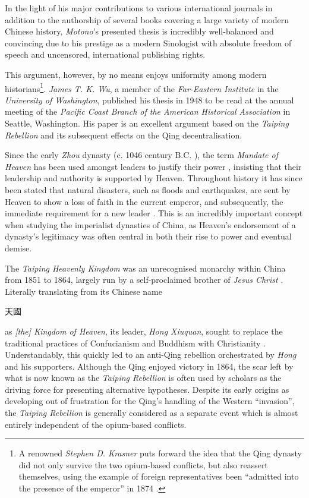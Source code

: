 \documentclass[a4paper,oneside]{article}
\newcommand{\zht}[1]{%
        \begin{CJK*}{UTF8}{bsmi}%
                \normalfont%
                #1
        \end{CJK*}
}
\begin{document}
In the light of his major contributions to various international journals in
addition to the authorship of several books covering a large variety of modern
Chinese history, \textit{Motono}'s presented thesis is incredibly well-balanced
and convincing due to his prestige as a modern Sinologist with absolute freedom
of speech and uncensored, international publishing rights.

This argument, however, by no means enjoys uniformity among modern
historians\footnote{A renowned \textit{Stephen D. Krasner} puts forward the idea
that the Qing dynasty did not only survive the two opium-based conflicts, but
also reassert themselves, using the example of foreign representatives been
``admitted into the presence of the emperor'' in 1874 \autocite{Krasner:2001}.}.
\textit{James T. K. Wu}, a member of the \textit{Far-Eastern Institute} in the
\textit{University of Washington}, published his thesis in 1948 to be read at
the annual meeting of the \textit{Pacific Coast Branch of the American
Historical Association} in Seattle, Washington. His paper is an excellent
argument based on the \textit{Taiping Rebellion} and its subsequent effects on
the Qing decentralisation.

Since the early \textit{Zhou} dynasty (c. 1046 century B.C.
\autocite{Loewe:1999}), the term \textit{Mandate of Heaven} has been used
amongst leaders to justify their power \autocite{Zhao:2009}, insisting that
their leadership and authority is supported by Heaven.  Throughout history it
has since been stated that natural disasters, such as floods and earthquakes,
are sent by Heaven to show a loss of faith in the current emperor, and
subsequently, the immediate requirement for a new leader \autocite{Elvin:1998}.
This is an incredibly important concept when studying the imperialist dynasties
of China, as Heaven's endorsement of a dynasty's legitimacy was often central in
both their rise to power and eventual demise.

The \textit{Taiping Heavenly Kingdom} was an unrecognised monarchy within China
from 1851 to 1864, largely run by a self-proclaimed brother of \textit{Jesus
Christ} \autocites{Reilly:2014}{Yap:1954}. Literally translating from its
Chinese name \zht{天國} as \textit{[the] Kingdom of Heaven}, its leader,
\textit{Hong Xiuquan}, sought to replace the traditional practices of
Confucianism and Buddhism with Christianity \autocite{Spence:1996}.
Understandably, this quickly led to an anti-Qing rebellion orchestrated by
\textit{Hong} and his supporters. Although the Qing enjoyed victory in 1864, the
scar left by what is now known as the \textit{Taiping Rebellion} is often used
by scholars as the driving force for presenting alternative hypotheses. Despite
its early origins as developing out of frustration for the Qing's handling of
the Western ``invasion'', the \textit{Taiping Rebellion} is generally considered
as a separate event which is almost entirely independent of the opium-based
conflicts.
\end{document}
